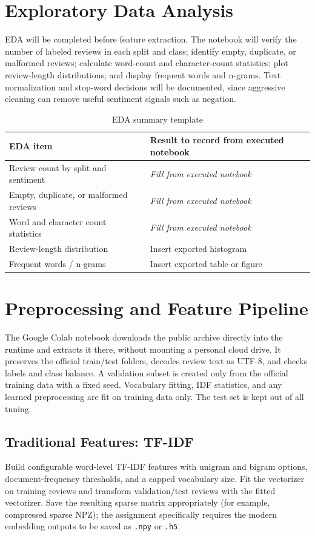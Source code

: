 \section{Exploratory Data Analysis}

EDA will be completed before feature extraction. The notebook will verify the number of labeled reviews in each split and class; identify empty, duplicate, or malformed reviews; calculate word-count and character-count statistics; plot review-length distributions; and display frequent words and n-grams. Text normalization and stop-word decisions will be documented, since aggressive cleaning can remove useful sentiment signals such as negation.

\begin{table}[H]
\centering
\begin{tabularx}{\textwidth}{lX}
\toprule
EDA item & Result to record from executed notebook \\
\midrule
Review count by split and sentiment & \textit{Fill from executed notebook} \\
Empty, duplicate, or malformed reviews & \textit{Fill from executed notebook} \\
Word and character count statistics & \textit{Fill from executed notebook} \\
Review-length distribution & Insert exported histogram \\
Frequent words / n-grams & Insert exported table or figure \\
\bottomrule
\end{tabularx}
\caption{EDA summary template}
\end{table}

\section{Preprocessing and Feature Pipeline}
The Google Colab notebook downloads the public archive directly into the runtime and extracts it there, without mounting a personal cloud drive. It preserves the official train/test folders, decodes review text as UTF-8, and checks labels and class balance. A validation subset is created only from the official training data with a fixed seed. Vocabulary fitting, IDF statistics, and any learned preprocessing are fit on training data only. The test set is kept out of all tuning.

\subsection{Traditional Features: TF-IDF}
Build configurable word-level TF-IDF features with unigram and bigram options, document-frequency thresholds, and a capped vocabulary size. Fit the vectorizer on training reviews and transform validation/test reviews with the fitted vectorizer. Save the resulting sparse matrix appropriately (for example, compressed sparse NPZ); the assignment specifically requires the modern embedding outputs to be saved as \texttt{.npy} or \texttt{.h5}.

